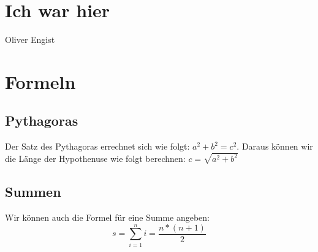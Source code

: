 \documentclass[12pt,a4paper]{article}
\begin{document}
\section{Ich war hier}
Oliver Engist
\section{Formeln}
\subsection{Pythagoras}
Der Satz des Pythagoras errechnet sich wie folgt: $ a^2+b^2=c^2 $. Daraus k\"onnen
wir die L\"ange der Hypothenuse wie folgt berechnen: $ c=\sqrt{a^2+b^2} $
\subsection{Summen}
Wir k\"onnen auch die Formel f\"ur eine Summe angeben:
\begin{equation}
s=\sum\limits_{i=1}^{n}i=\frac{n*(n + 1)}{2}
\end{equation}
\end{document}
